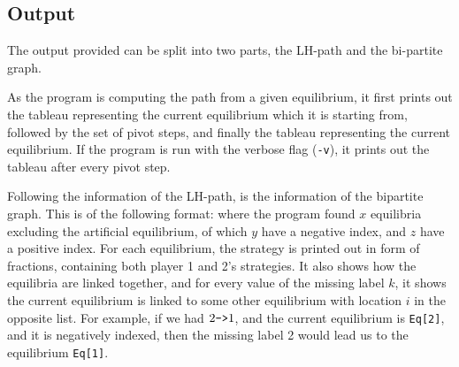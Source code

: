 \documentclass[a4paper,12pt]{article}  %
\begin{document}
    \subsection{Output}
    The output provided can be split into two parts, the LH-path and the
    bi-partite graph.
    
    As the program is computing the path from a given equilibrium, it
    first prints out the tableau representing the current equilibrium
    which it is starting from, followed by the set of pivot steps, and
    finally the tableau representing the current equilibrium. If the
    program is run with the verbose flag (\verb|-v|), it prints out
    the tableau after every pivot step.
    
    Following the information of the LH-path, is the information of the
    bipartite graph. This is of the following format:
    where the program found $x$ equilibria excluding the artificial equilibrium,
    of which $y$ have a negative index, and $z$ have a positive index. For each 
    equilibrium, the strategy is printed out in form of fractions, containing both
    player 1 and 2's strategies. It also shows how the equilibria are linked together,
    and for every value of the missing label $k$, it shows the current equilibrium
    is linked to some other equilibrium with location $i$ in the opposite list. For
    example, if we had $2 \verb|->| 1$, and the current equilibrium is \verb|Eq[2]|,
    and it is negatively indexed, then the missing label 2 would lead us to the equilibrium
    \verb|Eq[1]|. 
    
\end{document}
